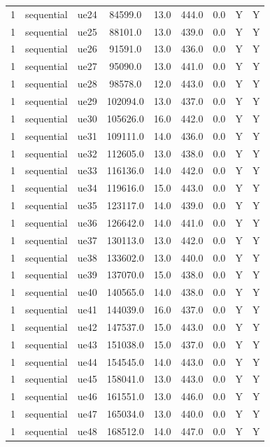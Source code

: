 \begin{table}[ht]
\begin{tabular}{|c|c|c|c|c|c|c|c|c|}
1 & sequential & ue24 & 84599.0 & 13.0 & 444.0 & 0.0 & Y & Y \\
1 & sequential & ue25 & 88101.0 & 13.0 & 439.0 & 0.0 & Y & Y \\
1 & sequential & ue26 & 91591.0 & 13.0 & 436.0 & 0.0 & Y & Y \\
1 & sequential & ue27 & 95090.0 & 13.0 & 441.0 & 0.0 & Y & Y \\
1 & sequential & ue28 & 98578.0 & 12.0 & 443.0 & 0.0 & Y & Y \\
1 & sequential & ue29 & 102094.0 & 13.0 & 437.0 & 0.0 & Y & Y \\
1 & sequential & ue30 & 105626.0 & 16.0 & 442.0 & 0.0 & Y & Y \\
1 & sequential & ue31 & 109111.0 & 14.0 & 436.0 & 0.0 & Y & Y \\
1 & sequential & ue32 & 112605.0 & 13.0 & 438.0 & 0.0 & Y & Y \\
1 & sequential & ue33 & 116136.0 & 14.0 & 442.0 & 0.0 & Y & Y \\
1 & sequential & ue34 & 119616.0 & 15.0 & 443.0 & 0.0 & Y & Y \\
1 & sequential & ue35 & 123117.0 & 14.0 & 439.0 & 0.0 & Y & Y \\
1 & sequential & ue36 & 126642.0 & 14.0 & 441.0 & 0.0 & Y & Y \\
1 & sequential & ue37 & 130113.0 & 13.0 & 442.0 & 0.0 & Y & Y \\
1 & sequential & ue38 & 133602.0 & 13.0 & 440.0 & 0.0 & Y & Y \\
1 & sequential & ue39 & 137070.0 & 15.0 & 438.0 & 0.0 & Y & Y \\
1 & sequential & ue40 & 140565.0 & 14.0 & 438.0 & 0.0 & Y & Y \\
1 & sequential & ue41 & 144039.0 & 16.0 & 437.0 & 0.0 & Y & Y \\
1 & sequential & ue42 & 147537.0 & 15.0 & 443.0 & 0.0 & Y & Y \\
1 & sequential & ue43 & 151038.0 & 15.0 & 437.0 & 0.0 & Y & Y \\
1 & sequential & ue44 & 154545.0 & 14.0 & 443.0 & 0.0 & Y & Y \\
1 & sequential & ue45 & 158041.0 & 13.0 & 443.0 & 0.0 & Y & Y \\
1 & sequential & ue46 & 161551.0 & 13.0 & 446.0 & 0.0 & Y & Y \\
1 & sequential & ue47 & 165034.0 & 13.0 & 440.0 & 0.0 & Y & Y \\
1 & sequential & ue48 & 168512.0 & 14.0 & 447.0 & 0.0 & Y & Y \\

\end{tabular}
\end{table}

